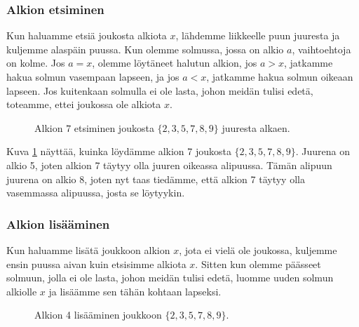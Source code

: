 \subsubsection{Alkion etsiminen}

Kun haluamme etsiä joukosta alkiota $x$, lähdemme liikkeelle
puun juuresta ja kuljemme alaspäin puussa.
Kun olemme solmussa, jossa on alkio $a$,
vaihtoehtoja on kolme.
Jos $a=x$, olemme löytäneet halutun alkion,
jos $a>x$, jatkamme hakua solmun vasempaan lapseen,
ja jos $a<x$, jatkamme hakua solmun oikeaan lapseen.
Jos kuitenkaan solmulla ei ole lasta,
johon meidän tulisi edetä, toteamme,
ettei joukossa ole alkiota $x$.

\begin{figure}
\center
{}
\caption{Alkion $7$ etsiminen joukosta $\{2,3,5,7,8,9\}$ juuresta alkaen.}
\label{fig:bihets}
\end{figure}

Kuva \ref{fig:bihets} näyttää, kuinka löydämme alkion 7
joukosta $\{2,3,5,7,8,9\}$.
Juurena on alkio 5, joten alkion 7 täytyy olla juuren
oikeassa alipuussa.
Tämän alipuun juurena on alkio 8,
joten nyt taas tiedämme, että alkion 7 täytyy olla
vasemmassa alipuussa, josta se löytyykin.

\subsubsection{Alkion lisääminen}

Kun haluamme lisätä joukkoon alkion $x$,
jota ei vielä ole joukossa, kuljemme ensin
puussa aivan kuin etsisimme alkiota $x$.
Sitten kun olemme päässeet solmuun,
jolla ei ole lasta, johon meidän tulisi edetä,
luomme uuden solmun alkiolle $x$ ja lisäämme
sen tähän kohtaan lapseksi.

\begin{figure}
\center
{}
\caption{Alkion 4 lisääminen joukkoon $\{2,3,5,7,8,9\}$.}
\label{fig:bihpu2}
\end{figure}

